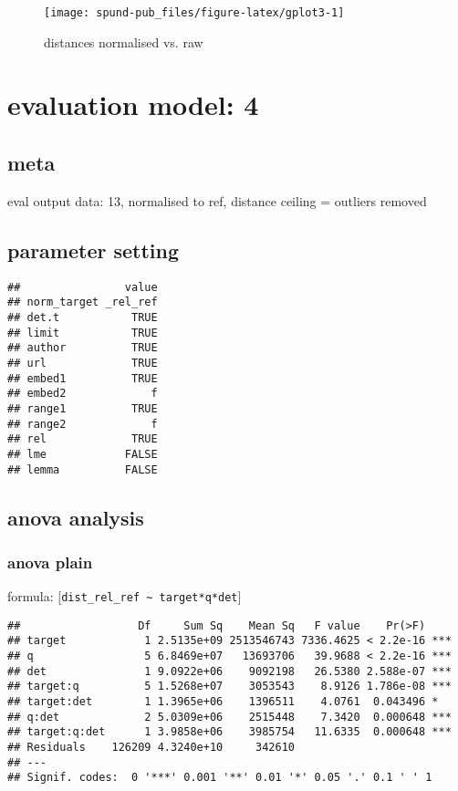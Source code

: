 \documentclass[
  12pt,
  oneside]{book}
\begin{document}
\begin{figure}[H]
\texttt{[image: spund-pub\_files/figure-latex/gplot3-1]} \caption{distances normalised vs. raw}\label{fig:gplot3}
\end{figure}

\section{evaluation model: 4}\label{evaluation-model-4}

\subsection{meta}\label{meta-3}

eval output data: 13, normalised to ref, distance ceiling = outliers removed

\subsection{parameter setting}\label{parameter-setting-3}

\begin{verbatim}
##                value
## norm_target _rel_ref
## det.t           TRUE
## limit           TRUE
## author          TRUE
## url             TRUE
## embed1          TRUE
## embed2             f
## range1          TRUE
## range2             f
## rel             TRUE
## lme            FALSE
## lemma          FALSE
\end{verbatim}

\subsection{anova analysis}\label{anova-analysis-3}

\subsubsection{anova plain}\label{anova-plain-3}

formula: {[}\texttt{dist\_rel\_ref\ \textasciitilde{}\ target*q*det}{]}

\begin{verbatim}
##                  Df     Sum Sq    Mean Sq   F value    Pr(>F)    
## target            1 2.5135e+09 2513546743 7336.4625 < 2.2e-16 ***
## q                 5 6.8469e+07   13693706   39.9688 < 2.2e-16 ***
## det               1 9.0922e+06    9092198   26.5380 2.588e-07 ***
## target:q          5 1.5268e+07    3053543    8.9126 1.786e-08 ***
## target:det        1 1.3965e+06    1396511    4.0761  0.043496 *  
## q:det             2 5.0309e+06    2515448    7.3420  0.000648 ***
## target:q:det      1 3.9858e+06    3985754   11.6335  0.000648 ***
## Residuals    126209 4.3240e+10     342610                        
## ---
## Signif. codes:  0 '***' 0.001 '**' 0.01 '*' 0.05 '.' 0.1 ' ' 1
\end{verbatim}
\end{document}
